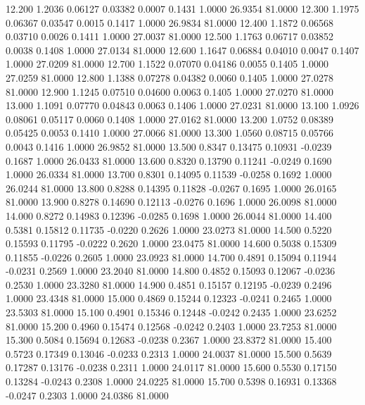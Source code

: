   12.200   1.2036   0.06127   0.03382   0.0007   0.1431   1.0000  26.9354  81.0000
  12.300   1.1975   0.06367   0.03547   0.0015   0.1417   1.0000  26.9834  81.0000
  12.400   1.1872   0.06568   0.03710   0.0026   0.1411   1.0000  27.0037  81.0000
  12.500   1.1763   0.06717   0.03852   0.0038   0.1408   1.0000  27.0134  81.0000
  12.600   1.1647   0.06884   0.04010   0.0047   0.1407   1.0000  27.0209  81.0000
  12.700   1.1522   0.07070   0.04186   0.0055   0.1405   1.0000  27.0259  81.0000
  12.800   1.1388   0.07278   0.04382   0.0060   0.1405   1.0000  27.0278  81.0000
  12.900   1.1245   0.07510   0.04600   0.0063   0.1405   1.0000  27.0270  81.0000
  13.000   1.1091   0.07770   0.04843   0.0063   0.1406   1.0000  27.0231  81.0000
  13.100   1.0926   0.08061   0.05117   0.0060   0.1408   1.0000  27.0162  81.0000
  13.200   1.0752   0.08389   0.05425   0.0053   0.1410   1.0000  27.0066  81.0000
  13.300   1.0560   0.08715   0.05766   0.0043   0.1416   1.0000  26.9852  81.0000
  13.500   0.8347   0.13475   0.10931  -0.0239   0.1687   1.0000  26.0433  81.0000
  13.600   0.8320   0.13790   0.11241  -0.0249   0.1690   1.0000  26.0334  81.0000
  13.700   0.8301   0.14095   0.11539  -0.0258   0.1692   1.0000  26.0244  81.0000
  13.800   0.8288   0.14395   0.11828  -0.0267   0.1695   1.0000  26.0165  81.0000
  13.900   0.8278   0.14690   0.12113  -0.0276   0.1696   1.0000  26.0098  81.0000
  14.000   0.8272   0.14983   0.12396  -0.0285   0.1698   1.0000  26.0044  81.0000
  14.400   0.5381   0.15812   0.11735  -0.0220   0.2626   1.0000  23.0273  81.0000
  14.500   0.5220   0.15593   0.11795  -0.0222   0.2620   1.0000  23.0475  81.0000
  14.600   0.5038   0.15309   0.11855  -0.0226   0.2605   1.0000  23.0923  81.0000
  14.700   0.4891   0.15094   0.11944  -0.0231   0.2569   1.0000  23.2040  81.0000
  14.800   0.4852   0.15093   0.12067  -0.0236   0.2530   1.0000  23.3280  81.0000
  14.900   0.4851   0.15157   0.12195  -0.0239   0.2496   1.0000  23.4348  81.0000
  15.000   0.4869   0.15244   0.12323  -0.0241   0.2465   1.0000  23.5303  81.0000
  15.100   0.4901   0.15346   0.12448  -0.0242   0.2435   1.0000  23.6252  81.0000
  15.200   0.4960   0.15474   0.12568  -0.0242   0.2403   1.0000  23.7253  81.0000
  15.300   0.5084   0.15694   0.12683  -0.0238   0.2367   1.0000  23.8372  81.0000
  15.400   0.5723   0.17349   0.13046  -0.0233   0.2313   1.0000  24.0037  81.0000
  15.500   0.5639   0.17287   0.13176  -0.0238   0.2311   1.0000  24.0117  81.0000
  15.600   0.5530   0.17150   0.13284  -0.0243   0.2308   1.0000  24.0225  81.0000
  15.700   0.5398   0.16931   0.13368  -0.0247   0.2303   1.0000  24.0386  81.0000
